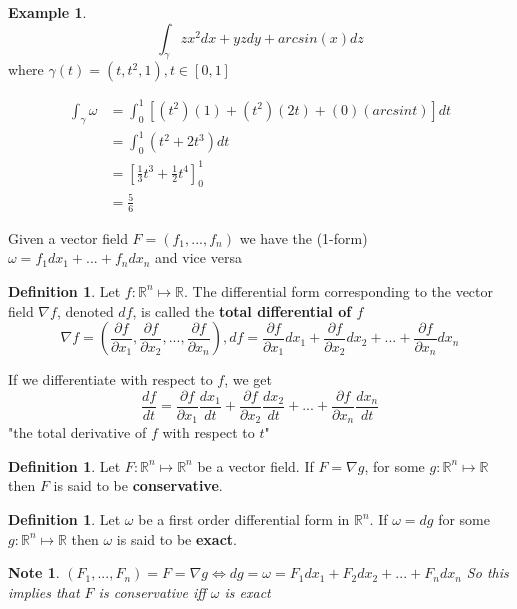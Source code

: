 \documentclass[12pt]{article}
\theoremstyle{plain}
\newtheorem*{note}{Note}
\theoremstyle{definition}
\newtheorem{definition}[theorem]{Definition}
\newtheorem{example}[theorem]{Example}
\begin{document}
\begin{example}
	$$\int_\gamma zx^2 dx + yzdy + arcsin(x)dz$$
	where $\gamma (t) = (t, t^2, 1), t\in [0,1]$
	
	\begin{align*}
		\int_\gamma \omega &= \int_0^1 [(t^2)(1) + (t^2)(2t) + (0)(arcsint) ]dt\\
		&= \int_0^1 (t^2+ 2t^3)dt\\
		&= [\frac{1}{3} t^3 + \frac{1}{2} t^4]_0^1\\
		&=\frac{5}{6}
	\end{align*}

\end{example}

Given a vector field $F=(f_1, ...,f_n)$ we have the (1-form) $\omega = f_1 dx_1 + ... + f_n dx_n$ and vice versa

\begin{definition}
	Let $f:\mathbb{R}^n \mapsto \mathbb{R}$. The differential form corresponding to the vector field $\nabla f$, denoted $df$, is called the \textbf{total differential of $f$}
	$$\nabla f = (\frac{\partial f}{\partial x_1}, \frac{\partial f}{\partial x_2}, ..., \frac{\partial f}{\partial x_n}), df = \frac{\partial f}{\partial x_1} d x_1 + \frac{\partial f}{\partial x_2} d x_2 + ... + \frac{\partial f}{\partial x_n} d x_n$$
\end{definition}

If we differentiate with respect to $f$, we get
$$\frac{df}{dt} = \frac{\partial f}{\partial x_1} \frac{d x_1}{dt} + \frac{\partial f}{\partial x_2} \frac{d x_2}{dt} + ... + \frac{\partial f}{\partial x_n} \frac{d x_n}{dt}$$
"the total derivative of $f$ with respect to $t$"

\begin{definition}
	Let $F:\mathbb{R}^n \mapsto \mathbb{R}^n$ be a vector field. If $F = \nabla g$, for some $g: \mathbb{R}^n \mapsto \mathbb{R}$ then $F$ is said to be \textbf{conservative}.
\end{definition}

\begin{definition}
	Let $\omega$ be a first order differential form in $\mathbb{R}^n$. If $\omega = dg$ for some $g: \mathbb{R}^n \mapsto \mathbb{R}$ then $\omega$ is said to be \textbf{exact}.
\end{definition}

\begin{note}
	$(F_1, ..., F_n) = F = \nabla g \Longleftrightarrow dg = \omega = F_1 dx_1 + F_2 dx_2 + ... + F_n dx_n$
	So this implies that $F$ is conservative iff $\omega$ is exact
\end{note}
\end{document}
